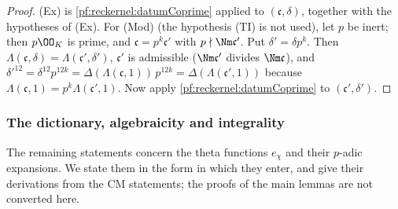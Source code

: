 \begin{proof}
(Ex) is \cref{pf:reckernel:datumCoprime} applied to $(\mathfrak c,\delta)$, together with the hypotheses of (Ex). For
(Mod) (the hypothesis (TI) is not used), let $p$ be inert; then $p\OO_K$ is prime, and $\mathfrak c=p^k\mathfrak c'$ with $p\nmid\Nm\mathfrak c'$. Put
$\delta'=\delta p^k$. Then $\Lambda(\mathfrak c,\delta)=\Lambda(\mathfrak c',\delta')$, $\mathfrak c'$ is admissible
($\Nm\mathfrak c'$ divides $\Nm\mathfrak c$), and $\delta'^{12}=\delta^{12}p^{12k}=\Delta(\Lambda(\mathfrak c,1))\,p^{12k}
=\Delta(\Lambda(\mathfrak c',1))$ because $\Lambda(\mathfrak c,1)=p^k\Lambda(\mathfrak c',1)$. Now apply
\cref{pf:reckernel:datumCoprime} to $(\mathfrak c',\delta')$.
\end{proof}

\subsubsection{The dictionary, algebraicity and integrality}
The remaining statements concern the theta functions $e_\chi$ and their $p$-adic expansions. We state them in the
form in which they enter, and give their derivations from the CM statements; the proofs of the main lemmas are not
converted here.

